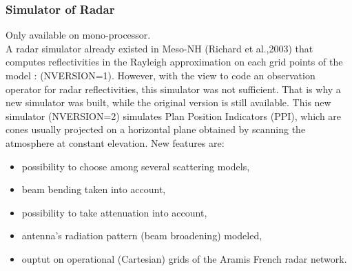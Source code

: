 \subsubsection{Simulator of Radar}
Only available on mono-processor.\\
A radar simulator already existed in Meso-NH (Richard et al.,2003) that computes reflectivities in the Rayleigh approximation on each grid points of the model : (NVERSION=1). However, with the view to code an observation operator for radar reflectivities, this simulator was not sufficient. That is why a new simulator was built, while the original version is still available. This new simulator (NVERSION=2) simulates Plan Position Indicators (PPI), which are cones usually projected on a horizontal plane obtained by scanning the atmosphere at constant elevation. New features are:
\begin{itemize}
\item possibility to choose among several scattering models,
\item beam bending taken into account,
\item possibility to take attenuation into account,
\item antenna's radiation pattern (beam broadening) modeled,
\item ouptut on operational (Cartesian) grids of the Aramis French radar network.
\end{itemize}
